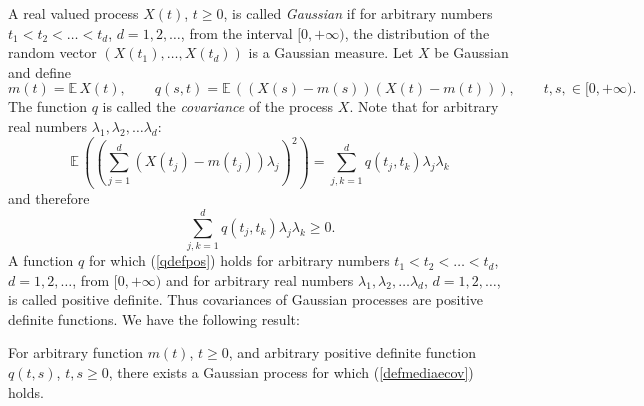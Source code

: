\documentclass[preprint]{imsart}
\def\E{\mathbb E}
\begin{document}
{\noindent A real valued process $X(t)$, $t\geq 0$, is called {\it Gaussian} if for
arbitrary numbers $t_1<t_2<\ldots<t_d$, $d=1,2,\ldots$, from the
interval $[0,+\infty)$, the distribution of the random vector
$(X(t_1),\ldots, X(t_d))$ is a Gaussian measure. Let $X$ be
Gaussian and define
\begin{equation}\label{defmediaecov}
  m(t)=\E\, X(t),\qquad q(s,t)= \E\,
  \left((X(s)-m(s))(X(t)-m(t))\right),
  \qquad t,s,\in [0,+\infty).
\end{equation}
The function $q$ is called the {\it covariance} of the process $X$.
Note that for arbitrary real numbers
$\lambda_1,\lambda_2,\ldots\lambda_d$:
$$
 \E\,
  \left(\left(\sum_{j=1}^d(X(t_j)-m(t_j))\lambda_j
  \right)^2\right)=
\sum_{j,k=1}^dq(t_j,t_k)\lambda_j\lambda_k
$$
and therefore
\begin{equation}\label{qdefpos}
  \sum_{j,k=1}^dq(t_j,t_k)\lambda_j\lambda_k\geq 0.
\end{equation}
A function $q$ for which (\ref{qdefpos}) holds
for arbitrary numbers $t_1<t_2<\ldots<t_d$, $d=1,2,\ldots$, from
$[0,+\infty)$
and for arbitrary real numbers
$\lambda_1,\lambda_2,\ldots\lambda_d$, $d=1,2,\ldots$, is called
positive definite. Thus covariances of Gaussian processes are
positive definite functions. We have the following result:

\begin{Theorem}
  For arbitrary function $m(t)$, $t\geq 0$, and arbitrary
  positive definite function $q(t,s)$, $t,s \geq 0$, there exists a
  Gaussian process for which (\ref{defmediaecov}) holds.
\end{Theorem}

}
\end{document}
